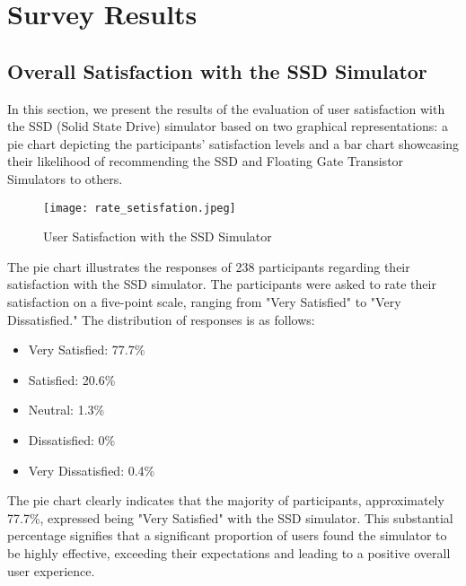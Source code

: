 \documentclass[conference]{/home/habib/Desktop/flash_ssd_simulator_web/paper_writing/latex_file/IEEEtran}
\begin{document}
\section{Survey Results}
\subsection{Overall Satisfaction with the SSD Simulator}
In this section, we present the results of the evaluation of user satisfaction with the SSD (Solid State Drive) simulator based on two graphical representations: a pie chart depicting the participants' satisfaction levels and a bar chart showcasing their likelihood of recommending the SSD and Floating Gate Transistor Simulators to others.
\begin{figure}[h]
    \centering
    \texttt{[image: rate\_setisfation.jpeg]}
    \caption{User Satisfaction with the SSD Simulator}
    \label{fig:enter-label}
\end{figure}
The pie chart illustrates the responses of 238 participants regarding their satisfaction with the SSD simulator. The participants were asked to rate their satisfaction on a five-point scale, ranging from "Very Satisfied" to "Very Dissatisfied." The distribution of responses is as follows:
\begin{itemize}
    \item Very Satisfied: 77.7\%
    \item Satisfied: 20.6\%
    \item Neutral: 1.3\%
    \item Dissatisfied: 0\%
    \item Very Dissatisfied: 0.4\%
\end{itemize}
The pie chart clearly indicates that the majority of participants, approximately 77.7\%, expressed being "Very Satisfied" with the SSD simulator. This substantial percentage signifies that a significant proportion of users found the simulator to be highly effective, exceeding their expectations and leading to a positive overall user experience.
\end{document}
